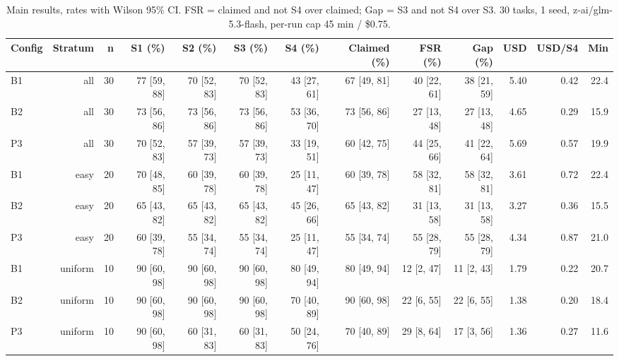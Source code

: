 \begin{table}
\caption{Main results, rates with Wilson 95\% CI. FSR = claimed and not S4 over claimed; Gap = S3 and not S4 over S3. 30 tasks, 1 seed, z-ai/glm-5.3-flash, per-run cap 45 min / \$0.75.}
\label{tab:main}
\begin{tabular}{lrrrrrrrrrrrr}
\toprule
Config & Stratum & n & S1 (\%) & S2 (\%) & S3 (\%) & S4 (\%) & Claimed (\%) & FSR (\%) & Gap (\%) & USD & USD/S4 & Min \\
\midrule
B1 & all & 30 & 77 [59, 88] & 70 [52, 83] & 70 [52, 83] & 43 [27, 61] & 67 [49, 81] & 40 [22, 61] & 38 [21, 59] & 5.40 & 0.42 & 22.4 \\
B2 & all & 30 & 73 [56, 86] & 73 [56, 86] & 73 [56, 86] & 53 [36, 70] & 73 [56, 86] & 27 [13, 48] & 27 [13, 48] & 4.65 & 0.29 & 15.9 \\
P3 & all & 30 & 70 [52, 83] & 57 [39, 73] & 57 [39, 73] & 33 [19, 51] & 60 [42, 75] & 44 [25, 66] & 41 [22, 64] & 5.69 & 0.57 & 19.9 \\
B1 & easy & 20 & 70 [48, 85] & 60 [39, 78] & 60 [39, 78] & 25 [11, 47] & 60 [39, 78] & 58 [32, 81] & 58 [32, 81] & 3.61 & 0.72 & 22.4 \\
B2 & easy & 20 & 65 [43, 82] & 65 [43, 82] & 65 [43, 82] & 45 [26, 66] & 65 [43, 82] & 31 [13, 58] & 31 [13, 58] & 3.27 & 0.36 & 15.5 \\
P3 & easy & 20 & 60 [39, 78] & 55 [34, 74] & 55 [34, 74] & 25 [11, 47] & 55 [34, 74] & 55 [28, 79] & 55 [28, 79] & 4.34 & 0.87 & 21.0 \\
B1 & uniform & 10 & 90 [60, 98] & 90 [60, 98] & 90 [60, 98] & 80 [49, 94] & 80 [49, 94] & 12 [2, 47] & 11 [2, 43] & 1.79 & 0.22 & 20.7 \\
B2 & uniform & 10 & 90 [60, 98] & 90 [60, 98] & 90 [60, 98] & 70 [40, 89] & 90 [60, 98] & 22 [6, 55] & 22 [6, 55] & 1.38 & 0.20 & 18.4 \\
P3 & uniform & 10 & 90 [60, 98] & 60 [31, 83] & 60 [31, 83] & 50 [24, 76] & 70 [40, 89] & 29 [8, 64] & 17 [3, 56] & 1.36 & 0.27 & 11.6 \\
\bottomrule
\end{tabular}
\end{table}
